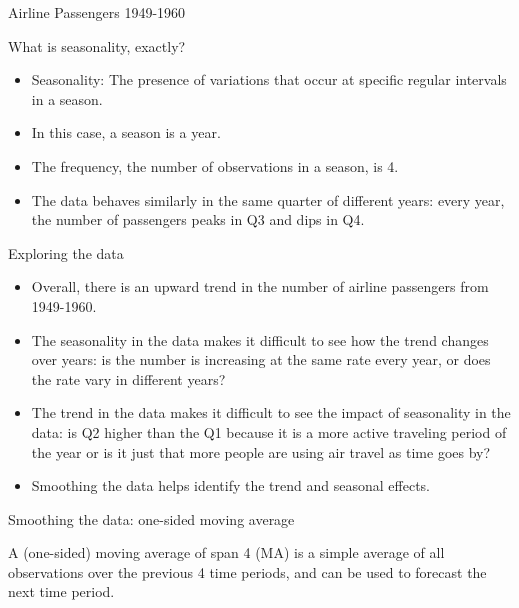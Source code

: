 \documentclass{beamer}\usepackage[]{graphicx}\usepackage[]{color}
\newenvironment{knitrout}{}{} %
\begin{document}
\begin{darkframes}
\begin{frame}[fragile]{Airline Passengers 1949-1960}
\begin{knitrout}
\end{knitrout}
    \end{frame}
    
    
    \begin{frame}{What is seasonality, exactly?}
      \begin{itemize}[<+->]
        \item Seasonality: The presence of variations that occur at specific regular intervals in a season.
        \item In this case, a season is a year.
        \item The frequency, the number of observations in a season, is 4. 
        \item The data behaves similarly in the same quarter of different years: every year, the number of passengers peaks in Q3 and dips in Q4.
      \end{itemize}
      
    \end{frame}
    
    
    \begin{frame}[fragile]{Exploring the data}
        \begin{itemize}[<+->]
        \item Overall, there is an upward trend in the number of airline passengers from 1949-1960.
        
        \item The seasonality in the data makes it difficult to see how the trend changes over years: is the number is increasing at the same rate every year, or does the rate vary in different years? 
        
        \item The trend in the data makes it difficult to see the impact of seasonality in the data: is Q2  higher than the Q1 because it is a more active traveling period of the year or is it just that more people are using air travel as time goes by?
        
        \item Smoothing the data helps identify the trend and seasonal effects.
        
        \lc
      \end{itemize}
    \end{frame}
    
    
    
    \begin{frame}[fragile]{Smoothing the data: one-sided moving average}
     
        A \alert{(one-sided) moving average of span 4} (MA) is a simple average of all observations over the previous 4 time periods, and can be used to forecast the next time period.
        

\end{frame}
\end{darkframes}
\end{document}
